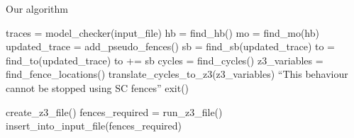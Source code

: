 \begin{algorithm}
\caption{Our algorithm}
\begin{algorithmic}[1]

    \State traces = model\_checker(input\_file)
    	\State hb = find\_hb()
		\State mo = find\_mo(hb)
		\State updated\_trace = add\_pseudo\_fences()
		\State sb = find\_sb(updated\_trace)
		\State to = find\_to(updated\_trace)
		\State to += sb
		\State cycles = find\_cycles()
    	 
        	\State z3\_variables = find\_fence\_locations()
	        \State translate\_cycles\_to\_z3(z3\_variables)
        \Else
    	    \State ``This behaviour cannot be stopped using SC fences''
			\State exit()
        \EndIf
    \EndFor
    
    \State create\_z3\_file()
	\State fences\_required = run\_z3\_file()
	\State insert\_into\_input\_file(fences\_required)
\EndProcedure

\end{algorithmic}
\end{algorithm}